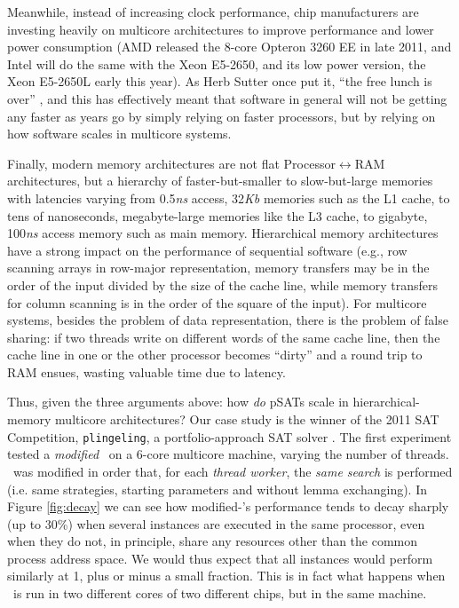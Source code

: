 \documentclass{llncs}
\begin{document}
Meanwhile, instead of increasing clock performance, chip manufacturers
are investing heavily on multicore architectures to improve
performance and lower power consumption (AMD released the 8-core
Opteron 3260 EE in late 2011, and Intel will do the same with the Xeon
E5-2650, and its low power version, the Xeon E5-2650L early this
year). As Herb Sutter once put it, ``the free lunch is over''
\cite{FreeLunchIsOver}, and this has effectively meant that software
in general will not be getting any faster as years go by simply
relying on faster processors, but by relying on how software scales in
multicore systems.

Finally, modern memory architectures are not flat
Processor$\leftrightarrow$RAM architectures, but a hierarchy of
faster-but-smaller to slow-but-large memories with latencies varying
from 0.5{\it ns} access, 32{\it Kb} memories such as the L1 cache, to
tens of nanoseconds, megabyte-large memories like the L3 cache, to
gigabyte, 100{\it ns} access memory such as main memory. Hierarchical
memory architectures have a strong impact on the performance of
sequential software (e.g., row scanning arrays in row-major
representation, memory transfers may be in the order of the input
divided by the size of the cache line, while memory transfers for
column scanning is in the order of the square of the input). For
multicore systems, besides the problem of data representation, there
is the problem of false sharing: if two threads write on different
words of the same cache line, then the cache line in one or the other
processor becomes ``dirty'' and a round trip to RAM ensues, wasting
valuable time due to latency.

Thus, given the three arguments above: how {\em do} pSATs scale in
hierarchical-memory multicore architectures? Our case study is the
winner of the 2011 SAT Competition, {\tt plingeling}, a
portfolio-approach SAT solver \cite{lingeling}. The first experiment
tested a \emph{modified} \pling\ on a 6-core multicore machine,
varying the number of threads. \pling\ was modified in order that, for
each {\em thread worker}, the {\em same search} is performed
(i.e. same strategies, starting parameters and without lemma
exchanging).  In Figure \ref{fig:decay} we can see how
modified-\pling's performance tends to decay sharply (up to 30\%) when
several instances are executed in the same processor, even when they
do not, in principle, share any resources other than the common
process address space. We would thus expect that all instances would
perform similarly at 1, plus or minus a small fraction. This is in
fact what happens when \pling\ is run in two different cores of two
different chips, but in the same machine.
\end{document}
